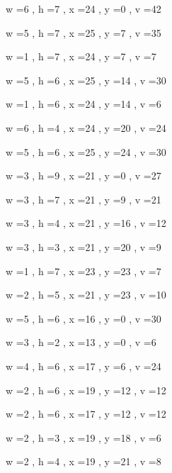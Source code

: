 \documentclass[11pt]{article}
\begin{document}


w =6 , h =7 , x =24 , y =0 , v =42
\par
w =5 , h =7 , x =25 , y =7 , v =35
\par
w =1 , h =7 , x =24 , y =7 , v =7
\par
w =5 , h =6 , x =25 , y =14 , v =30
\par
w =1 , h =6 , x =24 , y =14 , v =6
\par
w =6 , h =4 , x =24 , y =20 , v =24
\par
w =5 , h =6 , x =25 , y =24 , v =30
\par
w =3 , h =9 , x =21 , y =0 , v =27
\par
w =3 , h =7 , x =21 , y =9 , v =21
\par
w =3 , h =4 , x =21 , y =16 , v =12
\par
w =3 , h =3 , x =21 , y =20 , v =9
\par
w =1 , h =7 , x =23 , y =23 , v =7
\par
w =2 , h =5 , x =21 , y =23 , v =10
\par
w =5 , h =6 , x =16 , y =0 , v =30
\par
w =3 , h =2 , x =13 , y =0 , v =6
\par
w =4 , h =6 , x =17 , y =6 , v =24
\par
w =2 , h =6 , x =19 , y =12 , v =12
\par
w =2 , h =6 , x =17 , y =12 , v =12
\par
w =2 , h =3 , x =19 , y =18 , v =6
\par
w =2 , h =4 , x =19 , y =21 , v =8
\par
\newpage
\end{document}
